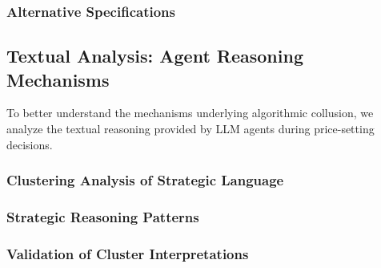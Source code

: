 \subsubsection*{Alternative Specifications}


\subsection{Textual Analysis: Agent Reasoning Mechanisms}

To better understand the mechanisms underlying algorithmic collusion, we analyze the textual reasoning provided by LLM agents during price-setting decisions. 

\subsubsection*{Clustering Analysis of Strategic Language}





\subsubsection*{Strategic Reasoning Patterns}


\subsubsection*{Validation of Cluster Interpretations}





